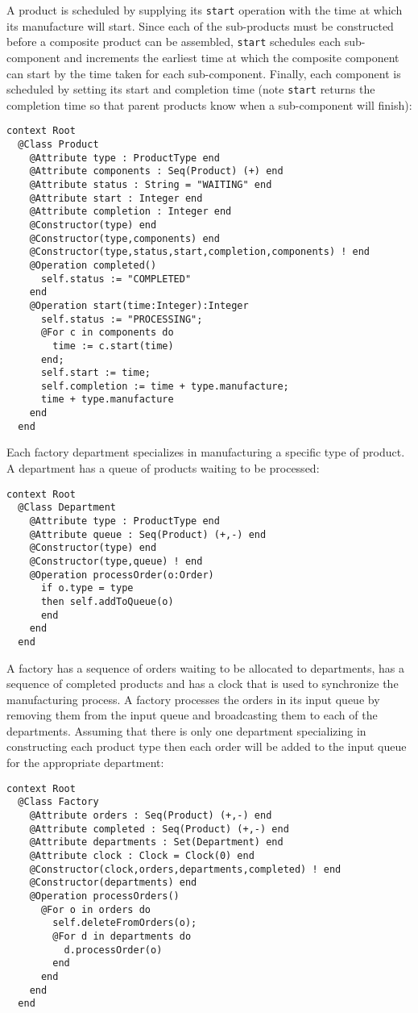 \documentclass{article}
\begin{document}
A product is scheduled by supplying its {\tt start} operation with the time at which its manufacture 
will start. Since each of the sub-products must be constructed before a composite product can be
assembled, {\tt start} schedules each sub-component and increments the earliest time at which the 
composite component can start by the time taken for each sub-component. Finally, each
component is scheduled by setting its start and completion time (note {\tt start} returns the
completion time so that parent products know when a sub-component will finish):
\begin{verbatim}
context Root
  @Class Product
    @Attribute type : ProductType end
    @Attribute components : Seq(Product) (+) end
    @Attribute status : String = "WAITING" end
    @Attribute start : Integer end
    @Attribute completion : Integer end
    @Constructor(type) end
    @Constructor(type,components) end
    @Constructor(type,status,start,completion,components) ! end
    @Operation completed()
      self.status := "COMPLETED"
    end
    @Operation start(time:Integer):Integer
      self.status := "PROCESSING";
      @For c in components do
        time := c.start(time)
      end;
      self.start := time;
      self.completion := time + type.manufacture;
      time + type.manufacture
    end
  end
\end{verbatim}
Each factory department specializes in manufacturing a specific type of product. A department 
has a queue of products waiting to be processed:
\begin{verbatim}
context Root
  @Class Department
    @Attribute type : ProductType end
    @Attribute queue : Seq(Product) (+,-) end
    @Constructor(type) end
    @Constructor(type,queue) ! end
    @Operation processOrder(o:Order)
      if o.type = type
      then self.addToQueue(o)
      end
    end
  end
\end{verbatim}
A factory has a sequence of orders waiting to be allocated to departments, has a 
sequence of completed products and has a clock that is used to synchronize the manufacturing
process. A factory processes the orders in its input queue by removing them from the input
queue and broadcasting them to each of the departments. Assuming that there is only one department
specializing in constructing each product type then each order will be added to the
input queue for the appropriate department:
\begin{verbatim}
context Root
  @Class Factory
    @Attribute orders : Seq(Product) (+,-) end
    @Attribute completed : Seq(Product) (+,-) end
    @Attribute departments : Set(Department) end
    @Attribute clock : Clock = Clock(0) end
    @Constructor(clock,orders,departments,completed) ! end
    @Constructor(departments) end
    @Operation processOrders()
      @For o in orders do
        self.deleteFromOrders(o);
        @For d in departments do
          d.processOrder(o)
        end
      end
    end
  end
\end{verbatim}
\end{document}
